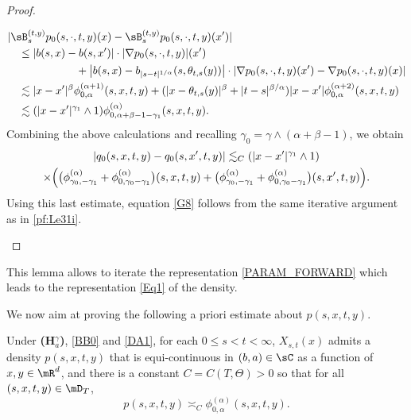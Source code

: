 \begin{proof}
\begin{enumerate}
\begin{align*}
&|\sB^{(t,y)}_{s} p_0(s,\cdot,t,y)(x)-\sB^{(t,y)}_{s} p_0(s,\cdot,t,y)(x')|\\
&\quad\leq |b(s,x)-b(s,x')|\cdot|\nabla p_0(s,\cdot,t,y)|(x')
\\&\hspace*{2.2cm}+\big|b(s,x)-b_{|s-t|^{1/\alpha}}(s, \theta_{t,s}(y))\big|
\cdot |\nabla p_0(s,\cdot,t,y)(x')-\nabla p_0(s,\cdot,t,y)(x)|
\\&\quad\lesssim|x-x'|^\beta\phi^{(\alpha+1)}_{0,\alpha}(s,x,t,y)+(|x-\theta_{t,s}(y)|^\beta+|t-s|^{\beta/\alpha})|x-x'|\phi^{(\alpha+2)}_{0,\alpha}(s,x,t,y)
\\&\quad\lesssim(|x-x'|^{\gamma_1}\wedge 1)\phi^{(\alpha)}_{0,\alpha+\beta-1-\gamma_1}(s,x,t,y).
\end{align*}
Combining the above calculations and recalling $\gamma_0=\gamma\wedge(\alpha+\beta-1)$, we obtain
\begin{multline*}
|q_0(s,x,t,y)-q_0(s,x',t,y)|\lesssim_C(|x-x'|^{\gamma_1}\wedge1)
\\\times\Bigl(\bigl(\phi^{(\alpha)}_{\gamma_0,-\gamma_1}+\phi^{(\alpha)}_{0,\gamma_0-\gamma_1}\bigr)(s,x,t,y)
+\bigl(\phi^{(\alpha)}_{\gamma_0,-\gamma_1}+\phi^{(\alpha)}_{0,\gamma_0-\gamma_1}\bigr)(s,x',t,y)\Bigr).
\end{multline*}
Using this last estimate, equation \eqref{G8} follows from the same iterative argument as in \eqref{pf:Le31i}.\qedhere
\end{enumerate}
\end{proof}
\begin{remark}
This lemma allows to iterate the representation \eqref{PARAM_FORWARD} which leads to the representation \eqref{Eq1} of the density.
\end{remark}
We now aim at proving the following a priori estimate about $p(s,x,t,y)$.
\begin{theorem}\label{T8}
Under {\bf (H$^\gamma_a$)}, \eqref{BB0} and \eqref{DA1}, for each $0\leq s<t<\infty$,
$X_{s,t}(x)$ admits a density $p(s,x,t,y)$ that is equi-continuous in $(b,a)\in\sC$ as a function of $x,y\in\mR^d$,
and there is a constant $C=C(T,\Theta)>0$ so that for all $(s,x,t,y)\in\mD_T$,
\begin{equation*}%
p(s,x,t,y)\asymp_C \phi^{(\alpha)}_{0,\alpha}(s,x,t,y).
\end{equation*}
\end{theorem}
